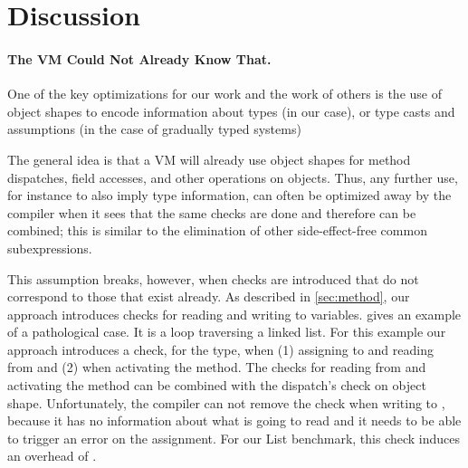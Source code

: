 
\section{Discussion}
\label{sec:discussion}

\paragraph{The VM Could Not Already Know That.}
\label{sec:disc-pathological-case}



One of the key optimizations for our work
and the work of others\citep{Richards2017,Bauman2017}
is the use of object shapes
to encode information about types
(in our case),
or type casts and assumptions
(in the case of gradually typed systems)

The general idea is that a VM will already use object shapes
for method dispatches, field accesses, and other operations on objects.
Thus, any further use, for instance to also imply type information,
can often be optimized away
by the compiler when it sees that the same checks are done
and therefore can be combined; this is similar to 
the elimination of other side-effect-free common subexpressions.

This assumption breaks, however, when checks are introduced
that do not correspond to those that exist already.
As described in \cref{sec:method},
our approach introduces checks for reading and writing to variables.
 gives an example of a pathological case.
It is a loop traversing a linked list.
For this example our approach 
introduces a check, for the  type,
when (1) assigning to and reading from  and
(2) when activating the  method.
The checks for reading from  and activating the method can be
combined with the dispatch's check on object shape.
%
Unfortunately, the compiler can not remove the check
when writing to , because it has no information about
what  is going to read and it needs to be able to trigger an error
on the assignment.
For our List benchmark, this check induces an overhead of \OverheadListP.

